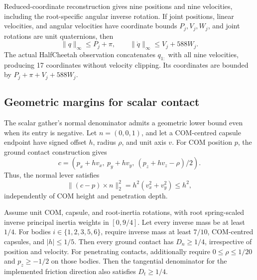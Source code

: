 Reduced-coordinate reconstruction gives nine positions and nine velocities, including the root-specific angular inverse rotation.
If joint positions, linear velocities, and angular velocities have coordinate bounds $P_j,V_j,W_j$, and joint rotations are unit quaternions, then
\begin{equation}
 \|q\|_\infty\le P_j+\pi,\qquad
 \|\dot q\|_\infty\le V_j+588W_j.
\end{equation}
The actual HalfCheetah observation concatenates $q_{1:}$ with all nine velocities, producing 17 coordinates without velocity clipping.
Its coordinates are bounded by $P_j+\pi+V_j+588W_j$.

\subsection{Geometric margins for scalar contact}
\label{app:scalar_margins}

The scalar gather's normal denominator admits a geometric lower bound even when its entry is negative.
Let $n=(0,0,1)$, and let a COM-centred capsule endpoint have signed offset $h$, radius $\rho$, and unit axis $v$.
For COM position $p$, the ground contact construction gives
\begin{equation}
 c=(p_x+hv_x,\ p_y+hv_y,\ (p_z+hv_z-\rho)/2).
\end{equation}
Thus, the normal lever satisfies
\begin{equation}
 \|(c-p)\times n\|_2^2=h^2(v_x^2+v_y^2)\le h^2,
\end{equation}
independently of COM height and penetration depth.

\begin{proposition}
\label{prop:scalar_margins}
Assume unit COM, capsule, and root-inertia rotations, with root spring-scaled inverse principal inertia weights in $[0,9/4]$.
Let every inverse mass be at least $1/4$.
For bodies $i\in\{1,2,3,5,6\}$, require inverse mass at least $7/10$, COM-centred capsules, and $|h|\le1/5$.
Then every ground contact has $D_n\ge1/4$, irrespective of position and velocity.
For penetrating contacts, additionally require $0\le\rho\le1/20$ and $p_z\ge-1/2$ on those bodies.
Then the tangential denominator for the implemented friction direction also satisfies $D_t\ge1/4$.
\end{proposition}


